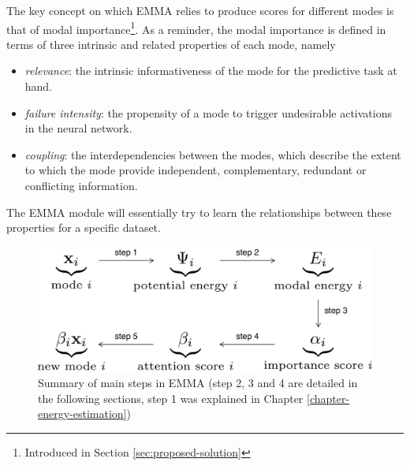 The key concept on which EMMA relies to produce scores for different modes is that of modal importance\footnote{Introduced in Section \ref{sec:proposed-solution}}. As a reminder, the modal importance is defined in terms of three intrinsic and related properties of each mode, namely
\begin{itemize}
\item \textit{relevance}: the intrinsic informativeness of the mode for the predictive task at hand.
\item \textit{failure intensity}: the propensity of a mode to trigger undesirable activations in the neural network.
\item \textit{coupling}: the interdependencies between the modes, which describe the extent to which the mode provide independent, complementary, redundant or conflicting information.
\end{itemize}
The EMMA module will essentially try to learn the relationships between these properties for a specific dataset. 

\begin{figure}[!ht]
\vspace*{5mm}
\centering
\includegraphics[scale=0.4]{figures/framework}
\caption[Summary of main steps in EMMA]{Summary of main steps in EMMA (step 2, 3 and 4 are detailed in the following sections, step 1 was explained in Chapter \ref{chapter-energy-estimation})}
\label{fig:framework}
\end{figure}\vspace*{5mm}

